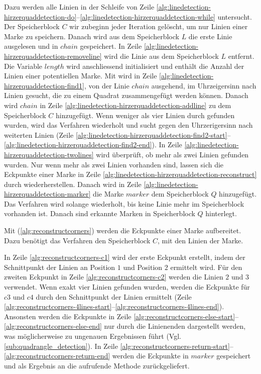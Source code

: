 

Dazu werden alle Linien in der Schleife von Zeile
 \ref{alg:linedetection-hirzerquaddetection-do}--\ref{alg:linedetection-hirzerquaddetection-while} untersucht. Der
 Speicherblock $C$ wir zubeginn jeder Iteration gelöscht, um nur Linien einer Marke zu speichern. Danach wird aus dem
 Speicherblock $L$ die erste Linie ausgelesen und in $\mathit{chain}$ gespeichert. In Zeile
 \ref{alg:linedetection-hirzerquaddetection-removeline} wird die Linie aus dem Speicherblock $L$ entfernt. Die Variable
 $\mathit{length}$ wird anschliessend initialisiert und enthält die Anzahl der Linien einer potentiellen Marke. Mit
  wird in Zeile \ref{alg:linedetection-hirzerquaddetection-find1}, von der Linie
 $\mathit{chain}$ ausgehend, im Uhrzeigersinn nach Linien gesucht, die zu einem Quadrat zusammengefügt werden können.
 Danach wird $\mathit{chain}$ in Zeile \ref{alg:linedetection-hirzerquaddetection-addline} zu dem Speicherblock $C$
 hinzugefügt. Wenn weniger als vier Linien durch  gefunden wurden, wird das Verfahren
 wiederholt und sucht gegen den Uhrzerigersinn nach weiterten Linien (Zeile
 \ref{alg:linedetection-hirzerquaddetection-find2-start}--\ref{alg:linedetection-hirzerquaddetection-find2-end}). In
 Zeile \ref{alg:linedetection-hirzerquaddetection-twolines} wird überprüft, ob mehr als zwei Linien gefunden wurden.
 Nur wenn mehr als zwei Linien vorhanden sind, lassen sich die Eckpunkte einer Marke in Zeile
 \ref{alg:linedetection-hirzerquaddetection-reconstruct} durch  wiederherstellen. Danach
 wird in Zeile \ref{alg:linedetection-hirzerquaddetection-marker} die Marke $\mathit{marker}$ dem Speicherblock $Q$
 hinzugefügt. Das Verfahren wird solange wiederholt, bis keine Linie mehr im Speicherblock vorhanden ist. Danach sind
 erkannte Marken in Speicherblock $Q$ hinterlegt.

Mit  (\autoref{alg:reconstructcorners}) werden die Eckpunkte einer Marke aufbereitet. Dazu
 benötigt das Verfahren den Speicherblock $C$, mit den Linien der Marke.



In Zeile \ref{alg:reconstructcorners-c1} wird der erste Eckpunkt erstellt, indem der Schnittpunkt der Linien an
 Position $1$ und Position $2$ ermittelt wird. Für den zweiten Eckpunkt in Zeile \ref{alg:reconstructcorners-c2} werden
 die Linien $2$ und $3$ verwendet. Wenn exakt vier Linien gefunden wurden, werden die Eckpunkte für $\mathit{c3}$ und
 $\mathit{c4}$ durch den Schnittpunkt der Linien ermittelt (Zeile
 \ref{alg:reconstructcorners-4lines-start}--\ref{alg:reconstructcorners-4lines-end}). Ansonsten werden die Eckpunkte in
 Zeile \ref{alg:reconstructcorners-else-start}--\ref{alg:reconstructcorners-else-end} nur durch die Linienenden
 dargestellt werden, was möglicherweise zu ungenauen Ergebnissen führt (Vgl. \autoref{sub:quadrangle_detection}). In
 Zeile \ref{alg:reconstructcorners-return-start}--\ref{alg:reconstructcorners-return-end} werden die Eckpunkte in
 $\mathit{marker}$ gespeichert und als Ergebnis an die aufrufende Methode zurückgeliefert.
